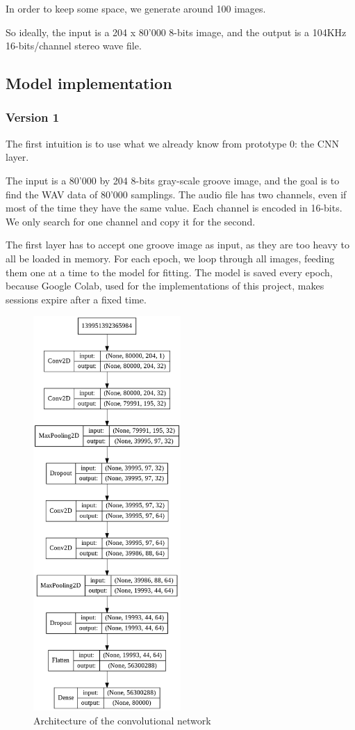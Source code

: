 \documentclass[12pt, twoside]{article}
\begin{document}
In order to keep some space, we generate around 100 images.

So ideally, the input is a 204 x 80'000 8-bits image, and the output is a 104KHz 16-bits/channel stereo wave file.
\subsection{Model implementation}
\subsubsection{Version 1}
The first intuition is to use what we already know from prototype 0: the CNN layer.

The input is a 80'000 by 204 8-bits gray-scale groove image, and the goal is to find the WAV data of 80'000 samplings.
The audio file has two channels, even if most of the time they have the same value. Each channel is encoded in 16-bits. We only search for one channel and copy it for the second.

The first layer has to accept one groove image as input, as they are too heavy to all be loaded in memory. For each epoch, we loop through all images, feeding them one at a time to the model for fitting. The model is saved every epoch, because Google Colab, used for the implementations of this project, makes sessions expire after a fixed time.

\begin{figure}[H]
	\centering
	\includegraphics[width=0.5\textwidth]{../images/model_v1.png}
	\caption{Architecture of the convolutional network}
	\label{archiv1}
\end{figure}
\end{document}
